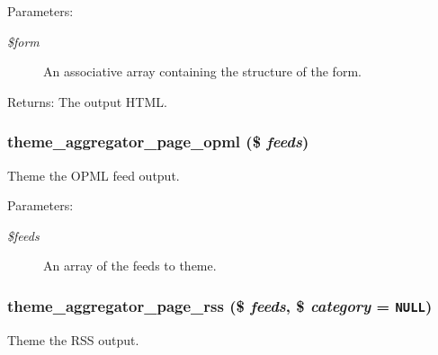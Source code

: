 \begin{Desc}
\item[Parameters:]
\begin{description}
\item[{\em \$form}]An associative array containing the structure of the form. \end{description}
\end{Desc}
\begin{Desc}
\item[Returns:]The output HTML. \end{Desc}
\hypertarget{group__themeable_gbafd2e326445cab10147eacd65c1c023}{
\subsubsection[{theme\_\-aggregator\_\-page\_\-opml}]{\setlength{\rightskip}{0pt plus 5cm}theme\_\-aggregator\_\-page\_\-opml (\$ {\em feeds})}}
\label{group__themeable_gbafd2e326445cab10147eacd65c1c023}


Theme the OPML feed output.

\begin{Desc}
\item[Parameters:]
\begin{description}
\item[{\em \$feeds}]An array of the feeds to theme. \end{description}
\end{Desc}
\hypertarget{group__themeable_g5a282bbb141cbf28b7aee12b14a74bf5}{
\subsubsection[{theme\_\-aggregator\_\-page\_\-rss}]{\setlength{\rightskip}{0pt plus 5cm}theme\_\-aggregator\_\-page\_\-rss (\$ {\em feeds}, \/  \$ {\em category} = {\tt NULL})}}
\label{group__themeable_g5a282bbb141cbf28b7aee12b14a74bf5}


Theme the RSS output.

